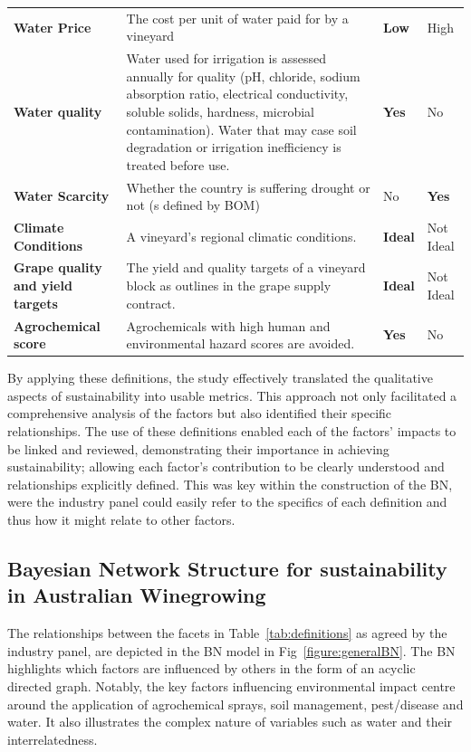 \documentclass[fleqn,10pt]{wlscirep}
\begin{document}
\begin{table}[h]
\begin{tabular}{@{}llll@{}}
    \textbf{Water Price} & The cost per unit of water paid for by a vineyard & \textbf{Low} & High \\
    \textbf{Water quality} & Water used for irrigation is assessed annually for quality (pH, chloride, sodium absorption ratio, electrical conductivity, soluble solids, hardness, microbial contamination). Water that may case soil degradation or irrigation inefficiency is treated before use. & \textbf{Yes} & No \\
    \textbf{Water Scarcity} & Whether the country is suffering drought or not (s defined by BOM) & No & \textbf{Yes} \\
    \textbf{Climate Conditions} & A vineyard's regional climatic conditions. & \textbf{Ideal} & Not Ideal \\
    \textbf{Grape quality and yield targets} & The yield and quality targets of a vineyard block as outlines in the grape supply contract. & \textbf{Ideal} & Not Ideal \\
    \textbf{Agrochemical score} & Agrochemicals with high human and environmental hazard scores are avoided. & \textbf{Yes} & No \\ \bottomrule
    \end{tabular}
\end{table}

By applying these definitions, the study effectively translated the qualitative aspects of sustainability into usable metrics. This approach not only facilitated a comprehensive analysis of the factors but also identified their specific relationships. The use of these definitions enabled each of the factors' impacts to be linked and reviewed, demonstrating their importance in achieving sustainability; allowing each factor's contribution to be clearly understood and relationships explicitly defined. This was key within the construction of the BN, were the industry panel could easily refer to the specifics of each definition and thus how it might relate to other factors.

\subsection{Bayesian Network Structure for sustainability in Australian Winegrowing}

The relationships between the facets in Table~\ref{tab:definitions}  as agreed by the industry panel, are depicted in the BN model in Fig~\ref{figure:generalBN}. The BN highlights which factors are influenced by others in the form of an acyclic directed graph. Notably, the key factors influencing environmental impact centre around the application of agrochemical sprays, soil management, pest/disease and water. It also illustrates the complex nature of variables such as water and their interrelatedness.
\end{document}
